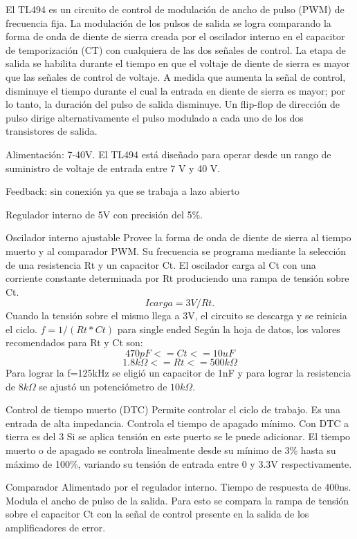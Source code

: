 El TL494 es un circuito de control de modulación de ancho de pulso (PWM) de frecuencia fija. 
La modulación de los pulsos de salida se logra comparando la forma de onda de diente de sierra creada por el oscilador interno en el capacitor de temporización (CT) con cualquiera de las dos señales de control. 
La etapa de salida se habilita durante el tiempo en que el voltaje de diente de sierra es mayor que las señales de control de voltaje. 
A medida que aumenta la señal de control, disminuye el tiempo durante el cual la entrada en diente de sierra es mayor; por lo tanto, la duración del pulso de salida disminuye. 
Un flip-flop de dirección de pulso dirige alternativamente el pulso modulado a cada uno de los dos transistores de salida.


Alimentación: 7-40V.
El TL494 está diseñado para operar desde un rango de suministro de voltaje de entrada entre 7 V y 40 V.

Feedback: sin conexión ya que se trabaja a lazo abierto

Regulador interno de 5V con precisión del 5\%. 

Oscilador interno ajustable 
Provee la forma de onda de diente de sierra al tiempo muerto y al comparador PWM. 
Su frecuencia se programa mediante la selección de una resistencia Rt y un capacitor Ct. 
El oscilador carga al Ct con una corriente constante determinada por Rt produciendo una rampa de tensión sobre Ct.
$$Icarga=3V/Rt.$$
Cuando la tensión sobre el mismo llega a 3V, el circuito se descarga y se reinicia el ciclo. 
$f=1/(Rt*Ct)$ para single ended 
Según la hoja de datos, los valores recomendados para Rt y Ct son:
$$470pF<=Ct<=10uF$$
$$1.8k\Omega<=Rt<=500k\Omega$$
Para lograr la f=125kHz se eligió un capacitor de 1nF y para lograr la resistencia de $8k\Omega$ se ajustó un potenciómetro de $10k\Omega$. 

Control de tiempo muerto (DTC)
Permite controlar el ciclo de trabajo. 
Es una entrada de alta impedancia. 
Controla el tiempo de apagado mínimo. Con DTC a tierra es del 3%
Si se aplica tensión en este puerto se le puede adicionar.
El tiempo muerto o de apagado se controla linealmente desde su mínimo de 3\% hasta su máximo de 100\%, 
variando su tensión de entrada entre 0 y 3.3V respectivamente. 

Comparador 
Alimentado por el regulador interno. 
Tiempo de respuesta de 400ns. 
Modula el ancho de pulso de la salida. Para esto se compara la rampa de tensión sobre el capacitor Ct con la señal de control
presente en la salida de los amplificadores de error. 

